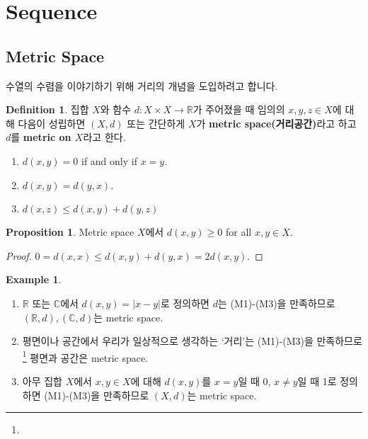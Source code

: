 \documentclass[12pt]{article}
\theoremstyle{definition}
\newtheorem{prop}[thm]{Proposition}
\newtheorem{defn}[thm]{Definition}
\newtheorem*{ex}{Example}
\def\RR{\mathbb{R}}
\def\CC{\mathbb{C}}
\newcommand{\abs}[1]{\left\vert#1\right\vert}
\begin{document}
\section{Sequence} \label{sec sequence}

\subsection{Metric Space}

수열의 수렴을 이야기하기 위해 거리의 개념을 도입하려고 합니다.

	\begin{defn} \label{metric}
		집합 \(X\)와 함수 \(d: X \times X \rightarrow \RR\)가 주어졌을 때 임의의 \(x, y, z \in X\)에 대해 다음이 성립하면 \((X, d)\) 또는 간단하게 \(X\)가 \textbf{metric space(거리공간)}라고 하고 \(d\)를 \textbf{metric on \(X\)}라고 한다.
		\begin{enumerate} [label=(M\arabic*), leftmargin=2\parindent]
			\item
			\(d(x, y) = 0\) if and only if \(x = y\).
			\item
			\(d(x, y) = d(y, x)\).
			\item
			\(d(x, z) \le d(x, y) + d(y, z)\)
		\end{enumerate}
	\end{defn}

	\begin{prop}
		Metric space \(X\)에서 \(d(x, y) \ge 0\) for all \(x, y \in X\).
	\end{prop}
	\begin{proof}
		\(0 = d(x, x) \le d(x, y) + d(y, x) = 2d(x, y)\).
	\end{proof}

	\begin{ex}
		\quad
		\begin{enumerate} [label=(\alph*), leftmargin=2\parindent]
			\item
			\(\RR\) 또는 \(\CC\)에서 \(d(x, y) = \abs{x - y}\)로 정의하면 \(d\)는 (M1)-(M3)을 만족하므로 \((\RR, d), (\CC, d)\)는 metric space.
			\item
			평면이나 공간에서 우리가 일상적으로 생각하는 `거리'는 (M1)-(M3)을 만족하므로\footnote{} 평면과 공간은 metric space.
			\item
			아무 집합 \(X\)에서 \(x, y \in X\)에 대해 \(d(x, y)\)를 \(x = y\)일 때 0, \(x \neq y\)일 때 1로 정의하면 (M1)-(M3)을 만족하므로 \((X, d)\)는 metric space.
		\end{enumerate}
	\end{ex}
\end{document}
